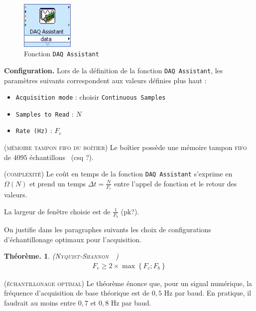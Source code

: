 \documentclass[twocolumn,pre,floats,aps,amsmath,amssymb]{revtex4}
\newtheorem{theorem}{Th\'eor\`eme.}[section]
\newenvironment{remark}[1][Remarque.]{\begin{trivlist}
\item[\hskip \labelsep {\bfseries #1}]}{\end{trivlist}}
\begin{document}
\begin{figure}[h]
  \includegraphics[width=2.5cm]{DAQ_Assistant.png}
\caption{Fonction \texttt{DAQ Assistant}}
\label{fig:NI_DAQ_Assitant}
\end{figure}

\noindent
\textbf{Configuration.} Lors de la d\'efinition de la fonction \texttt{DAQ Assistant}, les param\`etres suivants correspondent aux valeurs d\'efinies plus haut :
\begin{itemize}
  \item{\texttt{Acquisition mode} : choisir \texttt{Continuous Samples}}~\cite{NI_continuous_samp}
  \item{\texttt{Samples to Read} : $N$}
  \item{\texttt{Rate (Hz)} : $F_e$}
\end{itemize}

\begin{remark}
  (\textsc{m\'emoire tampon fifo du bo\^itier})
  Le bo\^itier poss\`ede une m\'emoire tampon \textsc{fifo} de $4095$ \'echantillons~\cite{NI_6353_datasheet} (csq ?).
\end{remark}

\begin{remark}
  \textsc{(complexit\'e)}
  Le co\^ut en temps de la fonction \texttt{DAQ Assistant} s'exprime en $\Omega(N)$\cite{omega} et prend un temps $\Delta t = \frac{N}{F_e}$ entre l'appel de fonction et le retour des valeurs.
\end{remark}

La largeur de fen\^etre choisie est de $\frac{1}{F_b}$ (pk?).

On justifie dans les paragraphes suivants les choix de configurations d'\'echantillonage optimaux pour l'acquisition.

\begin{theorem} (\textsc{Nyquist-Shannon}~\cite{Nyquist}~\cite{Shannon})
  \begin{eqnarray}
    F_e \geq 2 \times \operatorname{max} \left \{ F_c ; F_b \right \}
  \end{eqnarray}
\end{theorem}

\begin{remark}
  \textsc{(\'echantillonage optimal)}
  Le th\'eor\`eme \'enonce que, pour un signal num\'erique, la fr\'equence d'acquisition de base th\'eorique est de $0,5$ Hz par baud. En pratique, il faudrait au moins entre $0,7$ et $0,8$ Hz par baud\cite{FV}.
\end{remark}
\end{document}

